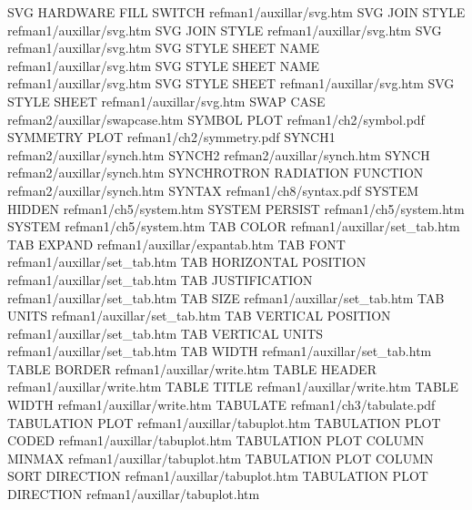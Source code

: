 SVG HARDWARE FILL SWITCH                refman1/auxillar/svg.htm
SVG JOIN STYLE                          refman1/auxillar/svg.htm
SVG JOIN STYLE                          refman1/auxillar/svg.htm
SVG                                     refman1/auxillar/svg.htm
SVG STYLE SHEET NAME                    refman1/auxillar/svg.htm
SVG STYLE SHEET NAME                    refman1/auxillar/svg.htm
SVG STYLE SHEET                         refman1/auxillar/svg.htm
SVG STYLE SHEET                         refman1/auxillar/svg.htm
SWAP CASE                               refman2/auxillar/swapcase.htm
SYMBOL PLOT                             refman1/ch2/symbol.pdf
SYMMETRY PLOT                           refman1/ch2/symmetry.pdf
SYNCH1                                  refman2/auxillar/synch.htm
SYNCH2                                  refman2/auxillar/synch.htm
SYNCH                                   refman2/auxillar/synch.htm
SYNCHROTRON RADIATION FUNCTION          refman2/auxillar/synch.htm
SYNTAX                                  refman1/ch8/syntax.pdf
SYSTEM HIDDEN                           refman1/ch5/system.htm
SYSTEM PERSIST                          refman1/ch5/system.htm
SYSTEM                                  refman1/ch5/system.htm
TAB COLOR                               refman1/auxillar/set_tab.htm
TAB EXPAND                              refman1/auxillar/expantab.htm
TAB FONT                                refman1/auxillar/set_tab.htm
TAB HORIZONTAL POSITION                 refman1/auxillar/set_tab.htm
TAB JUSTIFICATION                       refman1/auxillar/set_tab.htm
TAB SIZE                                refman1/auxillar/set_tab.htm
TAB UNITS                               refman1/auxillar/set_tab.htm
TAB VERTICAL POSITION                   refman1/auxillar/set_tab.htm
TAB VERTICAL UNITS                      refman1/auxillar/set_tab.htm
TAB WIDTH                               refman1/auxillar/set_tab.htm
TABLE BORDER                            refman1/auxillar/write.htm
TABLE HEADER                            refman1/auxillar/write.htm
TABLE TITLE                             refman1/auxillar/write.htm
TABLE WIDTH                             refman1/auxillar/write.htm
TABULATE                                refman1/ch3/tabulate.pdf
TABULATION PLOT                         refman1/auxillar/tabuplot.htm
TABULATION PLOT CODED                   refman1/auxillar/tabuplot.htm
TABULATION PLOT COLUMN MINMAX           refman1/auxillar/tabuplot.htm
TABULATION PLOT COLUMN SORT DIRECTION   refman1/auxillar/tabuplot.htm
TABULATION PLOT DIRECTION               refman1/auxillar/tabuplot.htm
